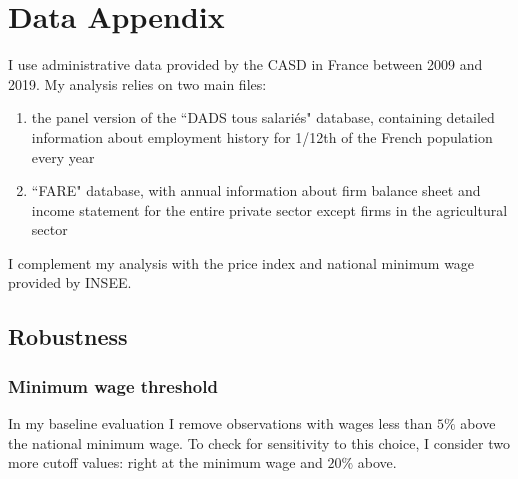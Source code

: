 \section{Data Appendix}
I use administrative data provided by the CASD in France between 2009 and 2019. My analysis
relies on two main files:
\begin{enumerate}
    \item the panel version of the “DADS tous salariés" database, containing detailed information
about employment history for 1/12th of the French population every year
    \item “FARE" database, with annual information about firm balance sheet and income statement
for the entire private sector except firms in the agricultural sector
\end{enumerate}
I complement my analysis with the price index and national minimum wage provided by INSEE.


\subsection{Robustness}
\subsubsection{Minimum wage threshold} \label{robust:min_wage}
In my baseline evaluation I remove observations with wages less than $5\%$ above the national minimum wage. To check for sensitivity to this choice, I consider two more cutoff values: right at the minimum wage and $20\%$ above.

